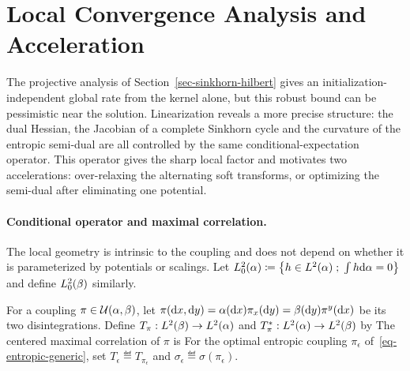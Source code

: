 \section{Local Convergence Analysis and Acceleration}
\label{sec-sinkhorn-local-acceleration}

The projective analysis of Section~\ref{sec-sinkhorn-hilbert} gives an initialization-independent global rate from the kernel alone, but this robust bound can be pessimistic near the solution. Linearization reveals a more precise structure: the dual Hessian, the Jacobian of a complete Sinkhorn cycle and the curvature of the entropic semi-dual are all controlled by the same conditional-expectation operator. This operator gives the sharp local factor and motivates two accelerations: over-relaxing the alternating soft transforms, or optimizing the semi-dual after eliminating one potential.

\paragraph{Conditional operator and maximal correlation.}

The local geometry is intrinsic to the coupling and does not depend on whether it is parameterized by potentials or scalings. Let
\(
	L_0^2(\alpha)\coloneqq\left\{ h\in L^2(\alpha) \;;\; \int h\mathrm{d}\alpha=0 \right\}
\)
and define \(L_0^2(\beta)\) similarly.

\begin{defn}\label{def-sinkhorn-conditional-operator}
	For a coupling $\pi\in\mathcal{U}(\alpha,\beta)$, let
	\(
		\pi(\mathrm{d} x,\mathrm{d} y)=\alpha(\mathrm{d} x)\pi_x(\mathrm{d} y)
		=\beta(\mathrm{d} y)\pi^y(\mathrm{d} x)
	\)
	be its two disintegrations. Define
	\(
		T_\pi:L^2(\beta)\to L^2(\alpha)
	\)
	and
	\(
		T_\pi^*:L^2(\alpha)\to L^2(\beta)
	\)
	by
	The centered maximal correlation of $\pi$ is
	For the optimal entropic coupling $\pi_\epsilon$ of~\eqref{eq-entropic-generic}, set
	\(
		T_\epsilon\eqdef T_{\pi_\epsilon}
	\)
	and
	\(
		\sigma_\epsilon\eqdef\sigma(\pi_\epsilon).
	\)
\end{defn}

